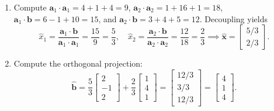 \documentclass[11pt, letterpaper]{article}
\theoremstyle{definition}
\theoremstyle{remark}
\begin{document}
\begin{enumerate}[label=(\alph*)]
    \item Compute $\mathbf{a}_1 \cdot \mathbf{a}_1 = 4+1+4 = 9$, $\mathbf{a}_2 \cdot \mathbf{a}_2 = 1+16+1 = 18$, $\mathbf{a}_1 \cdot \mathbf{b} = 6 - 1 + 10 = 15$, and $\mathbf{a}_2 \cdot \mathbf{b} = 3 + 4 + 5 = 12$. Decoupling yields
    \[
    \hat{x}_1 = \frac{\mathbf{a}_1 \cdot \mathbf{b}}{\mathbf{a}_1 \cdot \mathbf{a}_1} = \frac{15}{9} = \frac{5}{3}, \quad \hat{x}_2 = \frac{\mathbf{a}_2 \cdot \mathbf{b}}{\mathbf{a}_2 \cdot \mathbf{a}_2} = \frac{12}{18} = \frac{2}{3} \implies \hat{\mathbf{x}} = \begin{bmatrix} 5/3 \\ 2/3 \end{bmatrix}.
    \]
    \item Compute the orthogonal projection:
    \[
    \hat{\mathbf{b}} = \frac{5}{3} \begin{bmatrix} 2 \\ -1 \\ 2 \end{bmatrix} + \frac{2}{3} \begin{bmatrix} 1 \\ 4 \\ 1 \end{bmatrix} = \begin{bmatrix} 12/3 \\ 3/3 \\ 12/3 \end{bmatrix} = \begin{bmatrix} 4 \\ 1 \\ 4 \end{bmatrix}.
    \]
\end{enumerate}
\end{document}
